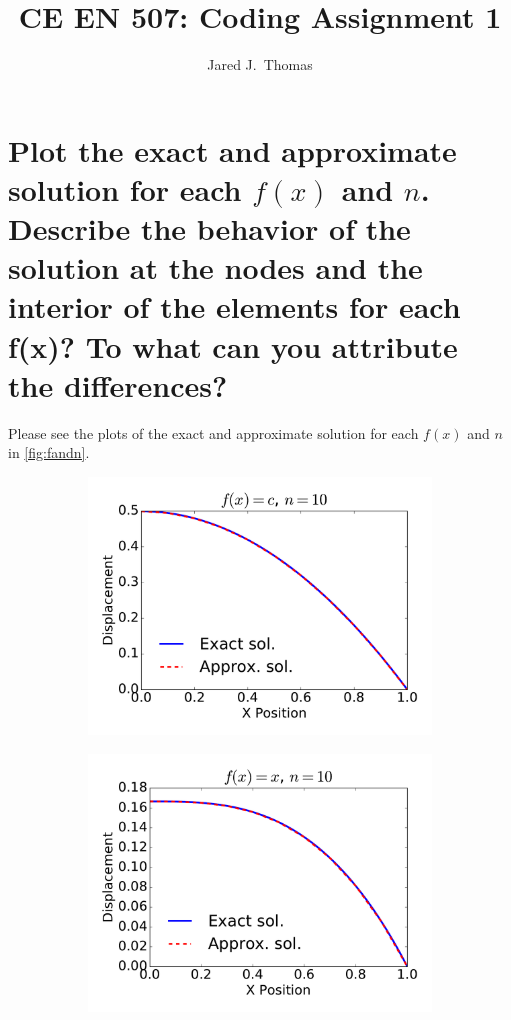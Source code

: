 \documentclass{article}
\title{CE EN 507: Coding Assignment 1}
\author{ Jared J.~Thomas}
\begin{document}
\maketitle

\section{Plot the exact and approximate solution for each $f(x)$ and $n$. Describe the behavior of the solution at the nodes and the interior of the elements for each f(x)? To what can you attribute the differences?}
Please see the plots of the exact and approximate solution for each $f(x)$ and $n$ in \cref{fig:fandn}.
\begin{figure}
	\centering
        \begin{subfigure}[b]{0.33\textwidth}
                \includegraphics[width=\linewidth]{displacement_func0_Nell10}
                \label{fig:gull}
        \end{subfigure}%
        \begin{subfigure}[b]{0.33\textwidth}
                \includegraphics[width=\linewidth]{displacement_func1_Nell10}

\end{subfigure}
\end{figure}
\end{document}
